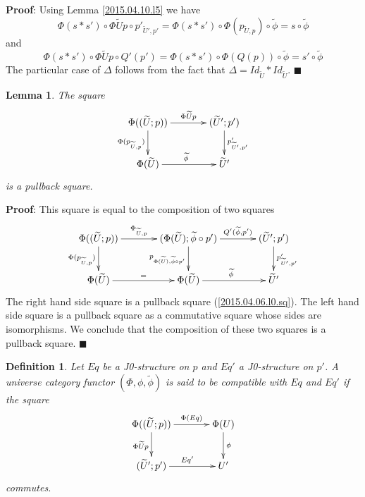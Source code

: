 \documentclass[12pt]{article}
\numberwithin{equation}{section}
\newenvironment{eq}{\begin{equation}}{\end{equation}}
\newenvironment{myproof}{{\bf Proof}:}{$\blacksquare$ \vskip 5mm }
\newtheorem{lemma}[proposition]{Lemma}
\newtheorem{definition}[proposition]{Definition}
\newcommand{\llabel}[1]{\label{#1}}
\newcommand{\wt}{\widetilde}
\begin{document}
%
\begin{myproof}
Using Lemma \ref{2015.04.10.l5} we have
%
$$\Phi(s*s')\circ \Phi\wt{U}p\circ
p'_{\wt{U}',p'}=\Phi(s*s')\circ\Phi(p_{\wt{U},p})\circ\wt{\phi}=s\circ
\wt{\phi}$$
%
and
%
$$\Phi(s*s')\circ \Phi\wt{U}p\circ Q'(p')=\Phi(s*s')\circ \Phi(Q(p))\circ
\wt{\phi}=s'\circ\wt{\phi}$$
%
The particular case of $\Delta$ follows from the fact that
$\Delta=Id_{\wt{U}}*Id_{\wt{U}}$.
\end{myproof}
%
\begin{lemma}
\llabel{2015.04.06.l5} The square
%
\begin{eq}\llabel{2015.04.06.eq10-bis}
\begin{xy}
          \xymatrix@C=3pc{ \Phi((\wt{U};p)) \ar[r]^-{\Phi\wt{U}p} \ar[d]_{
              \Phi(p_{\wt{U},p})} & (\wt{U}';p')
            \ar[d]^{p'_{\wt{U}',p'}}\\ \Phi(\wt{U}) \ar[r]^{\wt{\phi}} &
            \wt{U}' }
\end{xy}
\end{eq}
%
is a pullback square.
\end{lemma}
%
\begin{myproof}
This square is equal to the composition of two squares
%
$$
\begin{xy}
          \xymatrix@C=3pc{ \Phi((\wt{U};p)) \ar[r]^-{\Phi_{\wt{U},p}}\ar[d]_{
              \Phi(p_{\wt{U},p})} & (\Phi(\wt{U});\wt{\phi}\circ p')
            \ar[r]^-{Q'(\wt{\phi},p')}\ar[d]_{p_{\Phi(\wt{U}),\wt{\phi}\circ
                p'}} & (\wt{U}';p') \ar[d]^{p'_{\wt{U}',p'}}\\ \Phi(\wt{U})
            \ar[r]^{=} & \Phi(\wt{U}) \ar[r]^{\wt{\phi}} & \wt{U}' }
\end{xy}
$$
%
The right hand side square is a pullback square (\ref{2015.04.06.l0.sq}). The
left hand side square is a pullback square as a commutative square whose sides
are isomorphisms. We conclude that the composition of these two squares is a
pullback square.
\end{myproof}
%
\begin{definition}
\llabel{2015.04.06.def4} Let $Eq$ be a J0-structure on $p$ and $Eq'$ a
J0-structure on $p'$. A universe category functor $(\Phi,\phi,\wt{\phi})$ is
said to be compatible with $Eq$ and $Eq'$ if the square
%
\begin{eq}\llabel{2015.04.06.eq6}
\begin{xy}
          \xymatrix@C=3pc{ \Phi((\wt{U};p)) \ar[r]^-{\Phi(Eq)}
            \ar[d]_{\Phi\wt{U}p} & \Phi(U) \ar[d]^{\phi}\\ (\wt{U}';p')
            \ar[r]^{Eq'} & U' }
\end{xy}
\end{eq}
%
commutes.
\end{definition}
\end{document}
